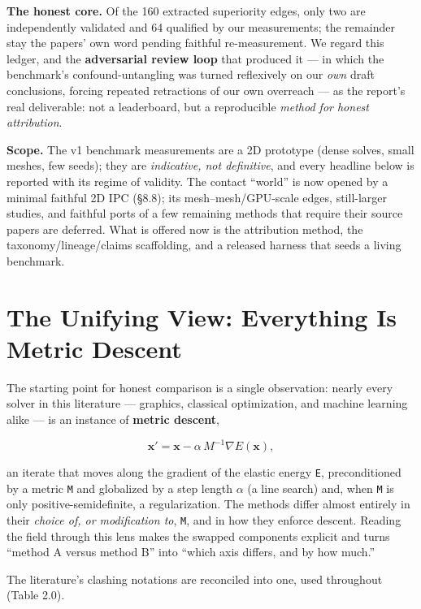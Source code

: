 \documentclass{egpubl}
\begin{document}
\textbf{The honest core.} Of the 160 extracted superiority edges, only two are independently validated and
64 qualified by our measurements; the remainder stay the papers' own word pending faithful
re-measurement. We regard this ledger, and the \textbf{adversarial review loop} that produced it --- in
which the benchmark's confound-untangling was turned reflexively on our \emph{own} draft conclusions,
forcing repeated retractions of our own overreach --- as the report's real deliverable: not a
leaderboard, but a reproducible \emph{method for honest attribution}.

\textbf{Scope.} The v1 benchmark measurements are a 2D prototype (dense solves, small meshes, few seeds);
they are \emph{indicative, not definitive}, and every headline below is reported with its regime of
validity. The contact ``world'' is now opened by a minimal faithful 2D IPC (\S8.8); its mesh--mesh/GPU-scale
edges, still-larger studies, and faithful ports of a few remaining methods that require their source
papers are deferred. What is offered now is the attribution method,
the taxonomy/lineage/claims scaffolding, and a released harness that seeds a living benchmark.


\section{The Unifying View: Everything Is Metric Descent}

The starting point for honest comparison is a single observation: nearly every solver in this
literature --- graphics, classical optimization, and machine learning alike --- is an instance of
\textbf{metric descent},

\begin{equation}
  \mathbf{x}' = \mathbf{x} - \alpha\, M^{-1} \nabla E(\mathbf{x}),
\end{equation}

an iterate that moves along the gradient of the elastic energy \texttt{E}, preconditioned by a metric \texttt{M}
and globalized by a step length \texttt{$\alpha$} (a line search) and, when \texttt{M} is only positive-semidefinite, a
regularization. The methods differ almost entirely in their \emph{choice of, or modification to}, \texttt{M}, and
in how they enforce descent. Reading the field through this lens makes the swapped components explicit
and turns ``method A versus method B'' into ``which axis differs, and by how much.''

The literature's clashing notations are reconciled into one, used throughout (Table 2.0).
\end{document}
